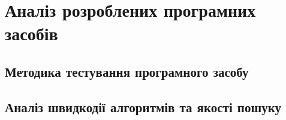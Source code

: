\newpage
\section{Аналіз розроблених програмних засобів}
\subsection{Методика тестування програмного засобу}
\subsection{Аналіз швидкодії алгоритмів та якості пошуку}
